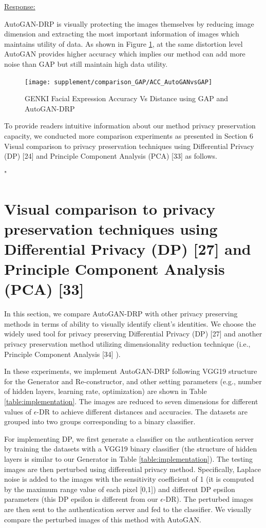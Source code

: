 \documentclass[]{elsarticle}
\begin{document}
\color{black}
\underline{Response:}

AutoGAN-DRP is visually protecting the images themselves by reducing image dimension and extracting the most important information of images which maintains utility of data. As shown in Figure \ref{fig:genki}, at the same distortion level AutoGAN provides higher accuracy which implies our method can add more noise than GAP but still maintain high data utility. 

\setcounter{figure}{6} 
\begin{figure}[H]
	\centering
	\texttt{[image: supplement/comparison\_GAP/ACC\_AutoGANvsGAP]}
	\captionsetup{justification=centering}
	\caption{GENKI Facial Expression Accuracy Vs Distance using GAP and AutoGAN-DRP}
	\label{fig:genki}
\end{figure}

To provide readers intuitive information about our method privacy preservation capacity, we conducted more comparison experiments as presented in Section 6 Visual comparison to privacy preservation techniques using Differential Privacy (DP) [24] and Principle Component Analysis (PCA) [33] as follows.


	\setcounter{section}{5} "
	\section{Visual comparison to privacy preservation techniques using Differential Privacy (DP) [27] and Principle Component Analysis (PCA) [33]}
	\label{AutoGAN_DP_PCA}
	In this section, we compare AutoGAN-DRP with other privacy preserving methods in terms of ability to visually identify client's identities. We choose the widely used tool for privacy preserving Differential Privacy (DP) [27] and another privacy preservation method utilizing dimensionality reduction technique (i.e., Principle Component Analysis [34] ).
	
	In these experiments, we implement AutoGAN-DRP following VGG19 structure for the Generator and Re-constructor, and other setting parameters (e.g., number of hidden layers, learning rate, optimization) are shown in Table \ref{table:implementation}. The images are reduced to seven dimensions for different values of $\epsilon$-DR to achieve different distances and accuracies. The datasets are grouped into two groups corresponding to a binary classifier. 
	
	For implementing DP, we first generate a classifier on the authentication server by training the datasets with a VGG19 binary classifier (the structure of hidden layers is similar to our Generator in Table \ref{table:implementation}). The testing images are then perturbed using differential privacy method. Specifically, Laplace noise is added to the images with the sensitivity coefficient of 1 (it is computed by the maximum range value of each pixel [0,1]) and different DP epsilon parameters (this DP epsilon is different from our $\epsilon$-DR). The perturbed images are then sent to the authentication server and fed to the classifier. We visually compare the perturbed images of this method with AutoGAN. 
	
\end{document}
